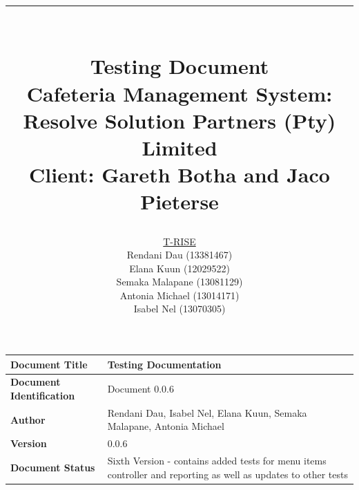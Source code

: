 \documentclass[a4paper,12pt]{report}
\title{ \rule{\textwidth}{1pt}  \\ \Huge Testing Document \\ 
	\Large Cafeteria Management System: Resolve Solution Partners (Pty) Limited \\
	\small Client: Gareth Botha and Jaco Pieterse}
\author{
         \underline{T-RISE}\\
          Rendani Dau (13381467) \\
	Elana Kuun (12029522) \\
	Semaka Malapane (13081129) \\
	Antonia Michael (13014171) \\
	Isabel Nel (13070305)}
\date{\today \\ \rule{\textwidth}{1pt}}
\begin{document}
\maketitle
\break

\tableofcontents
\break


 \begin{tabu} to 0.8\textwidth { | X[l] | X[l] | }
 \hline
 \textbf{Document Title} & Testing Documentation \\
 \hline
 \textbf{Document Identification}  & Document 0.0.6 \\
 \hline
 \textbf{Author}  & Rendani Dau, Isabel Nel, Elana Kuun, Semaka Malapane, Antonia Michael \\
 \hline
 \textbf{Version} & 0.0.6\\
 \hline
 \textbf{Document Status} & Sixth Version - contains added tests for menu items controller and reporting as well as updates to other tests  \\
 \hline
 \end{tabu}
\end{document}
